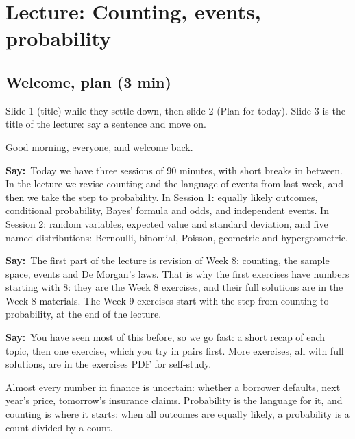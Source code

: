 \documentclass[11pt,a4paper,parskip=half]{scrartcl}
\newcommand{\say}{\textbf{\color{teal}Say:}\ }
\begin{document}
\ifdefined\scriptprint\else\tableofcontents\fi

\section{Lecture: Counting, events, probability}



\begin{printskip}
	\subsection{Welcome, plan (3 min)}

	\begin{slidecue}
		Slide 1 (title) while they settle down, then slide 2 (Plan for
		today). Slide 3 is the title of the lecture: say a sentence and move
		on.
	\end{slidecue}

	Good morning, everyone, and welcome back.

	\say Today we have three sessions of 90 minutes, with short breaks in
	between. In the lecture we revise counting and the language of events from
	last week, and then we take the step to probability. In Session 1:
	equally likely outcomes, conditional probability, Bayes' formula and odds,
	and independent events. In Session 2: random variables, expected value and
	standard deviation, and five named distributions: Bernoulli, binomial,
	Poisson, geometric and hypergeometric.

	\say The first part of the lecture is revision of Week 8: counting, the
	sample space, events and De Morgan's laws. That is why the first
	exercises have numbers starting with 8: they are the Week 8 exercises,
	and their full solutions are in the Week 8 materials. The Week 9 exercises
	start with the step from counting to probability, at the end of the
	lecture.

	\say You have seen most of this before, so we go fast: a short recap of
	each topic, then one exercise, which you try in pairs first. More
	exercises, all with full solutions, are in the exercises PDF for
	self-study.

	Almost every number in finance is uncertain: whether a borrower
	defaults, next year's price, tomorrow's insurance claims. Probability is
	the language for it, and counting is where it starts: when all outcomes
	are equally likely, a probability is a count divided by a count.
\end{printskip}
\end{document}
